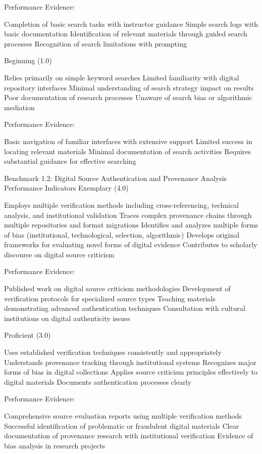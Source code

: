 \begin{appendices}
Performance Evidence:

Completion of basic search tasks with instructor guidance
Simple search logs with basic documentation
Identification of relevant materials through guided search processes
Recognition of search limitations with prompting

Beginning (1.0)

Relies primarily on simple keyword searches
Limited familiarity with digital repository interfaces
Minimal understanding of search strategy impact on results
Poor documentation of research processes
Unaware of search bias or algorithmic mediation

Performance Evidence:

Basic navigation of familiar interfaces with extensive support
Limited success in locating relevant materials
Minimal documentation of search activities
Requires substantial guidance for effective searching

Benchmark 1.2: Digital Source Authentication and Provenance Analysis
Performance Indicators
Exemplary (4.0)

Employs multiple verification methods including cross-referencing, technical analysis, and institutional validation
Traces complex provenance chains through multiple repositories and format migrations
Identifies and analyzes multiple forms of bias (institutional, technological, selection, algorithmic)
Develops original frameworks for evaluating novel forms of digital evidence
Contributes to scholarly discourse on digital source criticism

Performance Evidence:

Published work on digital source criticism methodologies
Development of verification protocols for specialized source types
Teaching materials demonstrating advanced authentication techniques
Consultation with cultural institutions on digital authenticity issues

Proficient (3.0)

Uses established verification techniques consistently and appropriately
Understands provenance tracking through institutional systems
Recognizes major forms of bias in digital collections
Applies source criticism principles effectively to digital materials
Documents authentication processes clearly

Performance Evidence:

Comprehensive source evaluation reports using multiple verification methods
Successful identification of problematic or fraudulent digital materials
Clear documentation of provenance research with institutional verification
Evidence of bias analysis in research projects


\end{appendices}
